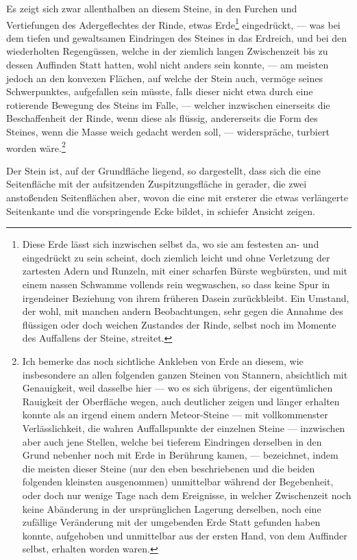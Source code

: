 \documentclass[a4paper, 11pt, oneside, german]{article}
\begin{document}
Es zeigt sich zwar allenthalben an diesem Steine, in den Furchen und Vertiefungen des Adergeflechtes der Rinde, etwas Erde\footnote{Diese Erde lässt sich inzwischen selbst da, wo sie am festesten an- und eingedrückt zu sein scheint, doch ziemlich leicht und ohne Verletzung der zartesten Adern und Runzeln, mit einer scharfen Bürste wegbürsten, und mit einem nassen Schwamme vollends rein wegwaschen, so dass keine Spur in irgendeiner Beziehung von ihrem früheren Dasein zurückbleibt. Ein Umstand, der wohl, mit manchen andern Beobachtungen, sehr gegen die Annahme des flüssigen oder doch weichen Zustandes der Rinde, selbst noch im Momente des Auffallens der Steine, streitet.} eingedrückt, --- was bei dem tiefen und gewaltsamen Eindringen des Steines in das Erdreich, und bei den wiederholten Regengüssen, welche in der ziemlich langen Zwischenzeit bis zu dessen Auffinden Statt hatten, wohl nicht anders sein konnte, --- am meisten jedoch an den konvexen Flächen, auf welche der Stein auch, vermöge seines Schwerpunktes, aufgefallen sein müsste, falls dieser nicht etwa durch eine rotierende Bewegung des Steins im Falle, --- welcher inzwischen einerseits die Beschaffenheit der Rinde, wenn diese als flüssig, andererseits die Form des Steines, wenn die Masse weich gedacht werden soll, --- widerspräche, turbiert worden wäre.\footnote{Ich bemerke das noch sichtliche Ankleben von Erde an diesem, wie insbesondere an allen folgenden ganzen Steinen von Stannern, absichtlich mit Genauigkeit, weil dasselbe hier --- wo es sich übrigens, der eigentümlichen Rauigkeit der Oberfläche wegen, auch deutlicher zeigen und länger erhalten konnte als an irgend einem andern Meteor-Steine --- mit vollkommenster Verlässlichkeit, die wahren Auffallspunkte der einzelnen Steine --- inzwischen aber auch jene Stellen, welche bei tieferem Eindringen derselben in den Grund nebenher noch mit Erde in Berührung kamen, --- bezeichnet, indem die meisten dieser Steine (nur den eben beschriebenen und die beiden folgenden kleinsten ausgenommen) unmittelbar während der Begebenheit, oder doch nur wenige Tage nach dem Ereignisse, in welcher Zwischenzeit noch keine Abänderung in der ursprünglichen Lagerung derselben, noch eine zufällige Veränderung mit der umgebenden Erde Statt gefunden haben konnte, aufgehoben und unmittelbar aus der ersten Hand, von dem Auffinder selbst, erhalten worden waren.}

Der Stein ist, auf der Grundfläche liegend, so dargestellt, dass sich die eine Seitenfläche mit der aufsitzenden Zuspitzungsfläche in gerader, die zwei anstoßenden Seitenflächen aber, wovon die eine mit ersterer die etwas verlängerte Seitenkante und die vorspringende Ecke bildet, in schiefer Ansicht zeigen.
\clearpage
\end{document}
